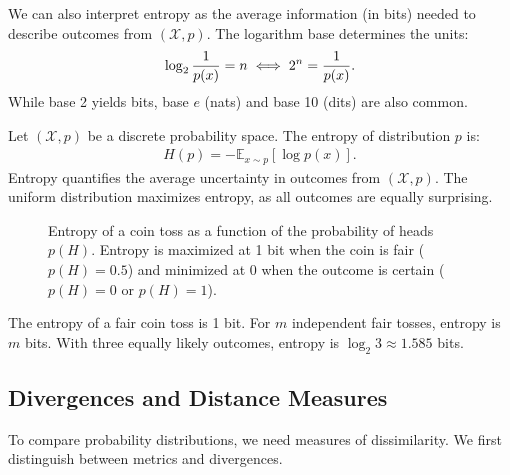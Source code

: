 We can also interpret entropy as the average information (in bits) needed to describe outcomes from $(\mathcal{X}, p)$. The logarithm base determines the units:
\begin{align}
  \label{eq:understand-log}
  \log_2{1 \over p(x)} = n \iff 2^n = {1 \over p(x)}.
\end{align}
While base 2 yields bits, base $e$ (nats) and base 10 (dits) are also common.

\begin{definition}
  Let $(\mathcal{X}, p)$ be a discrete probability space. The \textnormal{\sffamily entropy} of distribution $p$ is:
  \begin{align}
    \label{eq:entropy}
    H(p) = - \mathbb{E}_{x \sim p} \left[ \log{p(x)} \right].
  \end{align}
  Entropy quantifies the average uncertainty in outcomes from $(\mathcal{X}, p)$. The uniform distribution maximizes entropy, as all outcomes are equally surprising.
\end{definition}

\begin{figure}[H]
  \centering
  \caption{Entropy of a coin toss as a function of the probability of heads $p(H)$. Entropy is maximized at 1 bit when the coin is fair ($p(H)=0.5$) and minimized at 0 when the outcome is certain ($p(H)=0$ or $p(H)=1$).}%
  \label{fig:entropy-coin-toss}
\end{figure}

\begin{example}
  The entropy of a fair coin toss is 1 bit. For $m$ independent fair tosses, entropy is $m$ bits. With three equally likely outcomes, entropy is $\log_2{3} \approx 1.585$ bits.
\end{example}

\subsection{Divergences and Distance Measures}
To compare probability distributions, we need measures of dissimilarity. We first distinguish between metrics and divergences.

